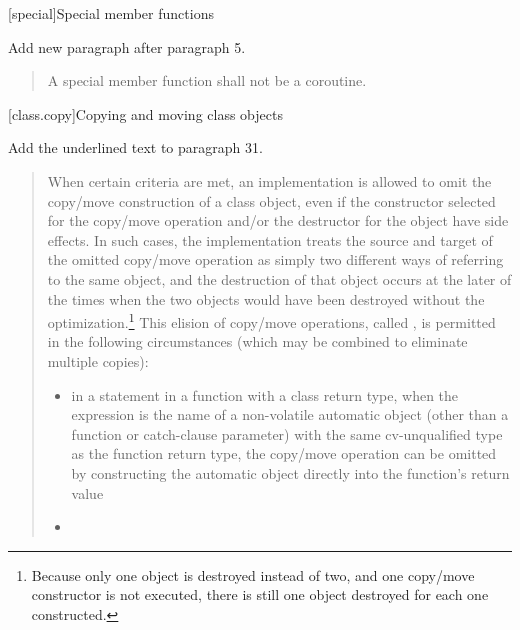 
\setcounter{chapter}{11}
[special]{Special member functions}

Add new paragraph after paragraph 5.

\begin{quote}
	\setcounter{Paras}{5}
	\pnum
	A special member function shall not be a coroutine.
\end{quote}

\setcounter{section}{7}
[class.copy]{Copying and moving class objects}%


Add the underlined text to paragraph 31.

\begin{quote}
\setcounter{Paras}{30}
\pnum
{}%
%
%
%
%
When certain criteria are met, an implementation is
allowed to omit the copy/move construction of a class object,
even if the constructor selected for the copy/move operation and/or the
destructor for the object have
%
side effects.  In such cases, the
implementation treats the source and target of the
omitted copy/move operation as simply two different ways of
referring to the same object, and the destruction of
that object occurs at the later of the times when the
two objects would have been destroyed without the
optimization.\footnote{Because only one object is destroyed instead of two,
  and one copy/move constructor
  is not executed, there is still one object destroyed for each one constructed.}
This elision of copy/move operations, called
%
%
,
is permitted in the
following circumstances (which may be combined to
eliminate multiple copies):

\begin{itemize}
  \item in a  statement in a function with a class return type,
  when the expression is the name of a non-volatile
  automatic object
  (other than a function or catch-clause parameter)
  with the same cv-unqualified type as
  the function return type, the copy/move operation can be
  omitted by constructing the automatic object directly
  into the function's return value
  \item
\end{itemize}
\end{quote}